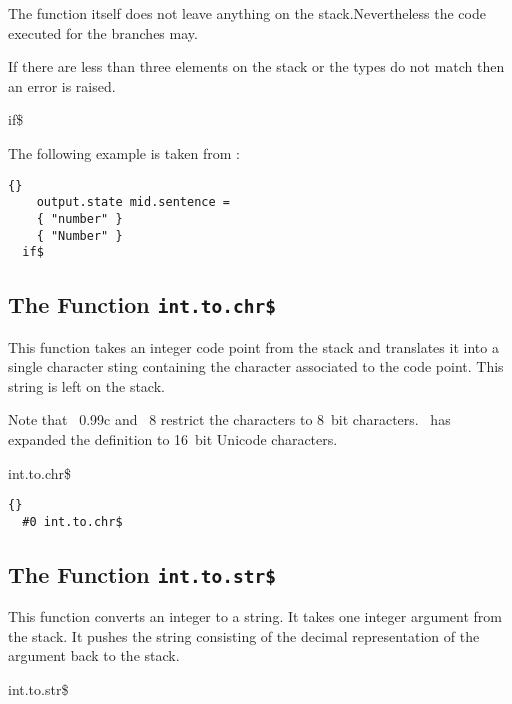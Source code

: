 The function itself does not leave anything on the stack.Nevertheless
the code executed for the branches may.

If there are less than three elements on the stack or the types do not
match then an error is raised.

\begin{BstFunction}{if\$}
\end{BstFunction}

The following example is taken from :

\begin{lstlisting}{}
    output.state mid.sentence =
    { "number" }
    { "Number" }
  if$
\end{lstlisting}

\subsection{The Function \texttt{int.to.chr\$}}%

This function takes an integer code point from the stack and
translates it into a single character sting containing the character
associated to the code point. This string is left on the stack.

Note that \BibTeX~0.99c and
\BibTeX~8 restrict the characters to
8~bit characters. \ExBib\ has expanded the definition to 16~bit
Unicode characters.

\begin{BstFunction}{int.to.chr\$}
\end{BstFunction}

\begin{lstlisting}{}
  #0 int.to.chr$
\end{lstlisting}

\subsection{The Function \texttt{int.to.str\$}}%

This function converts an integer to a string. It takes one integer
argument from the stack. It pushes the string consisting of the
decimal representation of the argument back to the stack.

\begin{BstFunction}{int.to.str\$}
\end{BstFunction}


